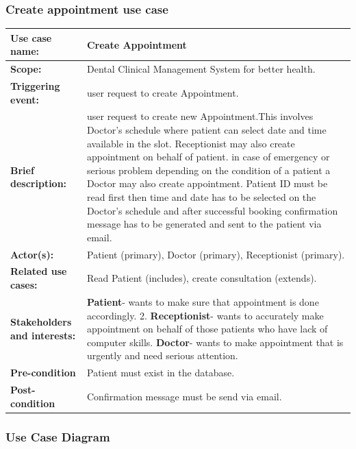 \documentclass[11 pt]{article}
\begin{document}
\subsubsection{Create appointment use case}
\begin{tabular}{|p{3cm}|p{9cm}|}
\hline
\textbf{Use case name:}& Create Appointment\\
\hline
\textbf{Scope:}& Dental Clinical Management System for better health.\\
\hline
\textbf{Triggering event:}& user request to create Appointment.\\
\hline
\textbf{Brief description:}& user request to create new Appointment.This involves Doctor's schedule where patient can select date and time available in the slot. Receptionist may also create appointment on behalf of patient. in case of emergency or serious problem depending on the condition of a patient a Doctor may also create appointment. Patient ID must be read first then time and date has to be selected on the Doctor's schedule and after successful booking confirmation message has to be generated and sent to the patient via email.    \\
\hline
\textbf{Actor(s):}& Patient (primary), Doctor (primary), Receptionist (primary).\\
\hline
\textbf{Related use cases:}& Read Patient (includes), create consultation (extends).\\
\hline
\textbf{Stakeholders and interests:}& \textbf{Patient}- wants to make sure that appointment is done accordingly. 2. \textbf{Receptionist}- wants to accurately make appointment on behalf of those patients who have lack of computer skills. \textbf{Doctor}- wants to make appointment that is urgently and need serious attention. \\
\hline
\textbf{Pre-condition}& Patient must exist in the database.\\
\hline
\textbf{Post-condition}& Confirmation message must be send via email.\\
\hline
\end{tabular}
\newpage
\subsubsection{Use Case Diagram}
\end{document}

